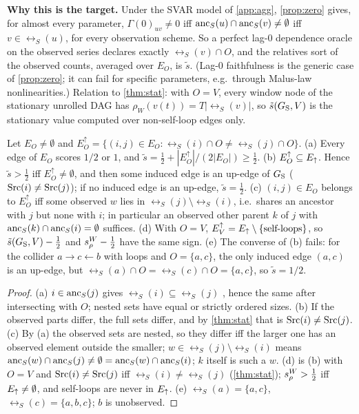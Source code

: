 \textbf{Why this is the target.} Under the SVAR model of \cref{app:agg},
\cref{prop:zero} gives, for almost every parameter, $\Gamma(0)_{uv}\ne0$ iff
$\mathrm{anc}_S(u)\cap\mathrm{anc}_S(v)\ne\emptyset$ iff $v\in\rel_S(u)$, for every
observation scheme. So a perfect lag-0 dependence oracle on the observed
series declares exactly $\rel_S(v)\cap O$, and the relatives sort of the
observed counts, averaged over $E_O$, is $\tilde s$. (Lag-0 faithfulness is the
generic case of \cref{prop:zero}; it can fail for specific parameters,
e.g.\ through Malus-law nonlinearities.) Relation to \cref{thm:stat}: with
$O=V$, every window node of the stationary unrolled DAG has
$\rho_W(v(t))=T|\rel_S(v)|$, so $\tilde s(G_{\mathrm S},V)$ is the stationary value
computed over non-self-loop edges only.

\begin{proposition}\label{prop:estimand}
Let $E_O\ne\emptyset$ and $E_O^\uparrow=\{(i,j)\in E_O:\rel_S(i)\cap O\ne\rel_S(j)\cap O\}$.
(a) Every edge of $E_O$ scores $1/2$ or $1$, and
$\tilde s=\tfrac12+|E_O^\uparrow|/(2|E_O|)\ge\tfrac12$.
(b) $E_O^\uparrow\subseteq E_{\uparrow}$. Hence $\tilde s>\tfrac12$ iff
$E_O^\uparrow\neq\emptyset$, and then some induced edge is an up-edge of $G_{\mathrm S}$
($\mathrm{Src}(i)\ne\mathrm{Src}(j)$); if no induced edge is an up-edge, $\tilde s=\tfrac12$.
(c) $(i,j)\in E_O$ belongs to $E_O^\uparrow$ iff some observed $w$ lies in
$\rel_S(j)\setminus\rel_S(i)$, i.e.\ shares an ancestor with $j$ but none with
$i$; in particular an observed other parent $k$ of $j$ with
$\mathrm{anc}_S(k)\cap\mathrm{anc}_S(i)=\emptyset$ suffices.
(d) With $O=V$, $E_V^\uparrow=E_{\uparrow}\setminus\{\text{self-loops}\}$, so
$\tilde s(G_{\mathrm S},V)-\tfrac12$ and $s_\rho^W-\tfrac12$ have the same sign.
(e) The converse of (b) fails: for the collider $a\to c\leftarrow b$ with loops
and $O=\{a,c\}$, the only induced edge $(a,c)$ is an up-edge, but
$\rel_S(a)\cap O=\rel_S(c)\cap O=\{a,c\}$, so $\tilde s=1/2$.
\end{proposition}
\begin{proof}
(a) $i\in\mathrm{anc}_S(j)$ gives $\rel_S(i)\subseteq\rel_S(j)$
\citep[Thm.~1]{reisach2026topological}, hence the same after intersecting with
$O$; nested sets have equal or strictly ordered sizes. (b) If the observed parts
differ, the full sets differ, and by \cref{thm:stat} that is $\mathrm{Src}(i)\ne\mathrm{Src}(j)$.
(c) By (a) the observed sets are nested, so they differ iff the larger one has
an observed element outside the smaller; $w\in\rel_S(j)\setminus\rel_S(i)$ means
$\mathrm{anc}_S(w)\cap\mathrm{anc}_S(j)\ne\emptyset=\mathrm{anc}_S(w)\cap\mathrm{anc}_S(i)$; $k$ itself is such a
$w$. (d) is (b) with $O=V$ and $\mathrm{Src}(i)\ne\mathrm{Src}(j)$ iff $\rel_S(i)\ne\rel_S(j)$
(\cref{thm:stat}); $s_\rho^W>\tfrac12$ iff $E_{\uparrow}\ne\emptyset$, and self-loops are
never in $E_{\uparrow}$. (e) $\rel_S(a)=\{a,c\}$, $\rel_S(c)=\{a,b,c\}$; $b$ is unobserved.
\end{proof}

